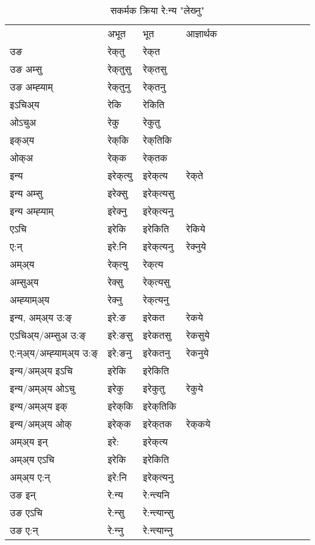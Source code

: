 \begin{table}[H]
\label{ekt.vt} \centering
\caption{सकर्मक क्रिया  रे:न्य  "लेख्‍नु"  }
\begin{tabular}{l|l|l|l|l|l|l|l|l|l|l|l|l}  \toprule
&अभूत & भूत & आज्ञार्थक \\ 
उङ &रेक्‌तु &रेक्‌त \\ 
उङ अम्सु&रेक्‌तुसु &रेक्‌तसु \\ 
उङ अम्ह्‍याम्&रेक्‌तुनु &रेक्‌तनु \\ 
इऽचिअ्य &रेकि &रेकिति   \\ 
ओऽचुअ        &रेकु &रेकुतु   \\ 
इक्अ्य&रेक्‌कि &रेक्‌तिकि   \\ 
ओक्अ &रेक्‌क &रेक्‌तक   \\ 
इन्य & इरेक्‌त्यु  & इरेक्‌त्य &रेक्‌ते  \\ 
इन्य अम्सु& इरेक्सु  & इरेक्‌त्यसु   \\ 
इन्य अम्ह्‍याम्& इरेक्‍नु  & इरेक्‌त्यनु   \\ 
एऽचि & इरेकि & इरेकिति &रेकिये    \\ 
ए:न् & इरे:नि  & इरेक्‌त्यनु &रेक्‍नुये  \\ 
अम्अ्य & रेक्‌त्यु  & रेक्‌त्य  \\ 
अम्सुअ्य & रेक्सु & रेक्‌त्यसु  \\ 
अम्ह्‍याम्अ्य & रेक्‍नु  & रेक्‌त्यनु \\ 
\midrule
इन्य, अम्अ्य उ:ङ्‌ &इरे:ङ &इरेकत &रेकये \\ 
एऽचिअ्य/अम्सुअ उ:ङ्‌ &इरे:ङसु &इरेकतसु &रेकसुये \\ 
ए:न्अ्य/अम्ह्‍याम्अ्य उ:ङ्‌ &इरे:ङनु &इरेकतनु &रेकनुये \\ 
इन्य/अम्अ्य इऽचि &इरेकि &इरेकिति    \\ 
इन्य/अम्अ्य ओऽचु &इरेकु &इरेकुतु  &रेकुये  \\ 
इन्य/अम्अ्य इक् &इरेक्‌कि &इरेक्‌तिकि   \\ 
इन्य/अम्अ्य ओक् &इरेक्‌क &इरेक्‌तक  &रेक्‌कये  \\ 
अम्अ्य इन् & इरे: & इरेक्‌त्य   \\ 
अम्अ्य एऽचि & इरेकि & इरेकिति    \\ 
अम्अ्य ए:न् & इरे:नि  & इरेक्‌त्यनु  \\ 
\midrule
उङ इन् & रे:न्य  & रे:न्त्यनि  \\ 
उङ एऽचि & रे:न्सु  & रे:न्त्यान्सु   \\ 
उङ ए:न्& रे:न्‍नु  & रे:न्त्यान्‍नु   \\ 
\bottomrule
\end{tabular}
\end{table}


